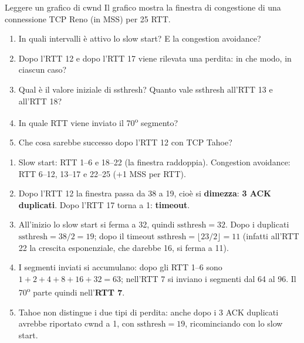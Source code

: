 \begin{esercizio}{Leggere un grafico di cwnd}
Il grafico mostra la finestra di congestione di una connessione TCP Reno (in MSS) per 25 RTT.
\begin{center}
\end{center}
\begin{enumerate}[label=(\alph*)]
    \item In quali intervalli è attivo lo slow start? E la congestion avoidance?
    \item Dopo l'RTT 12 e dopo l'RTT 17 viene rilevata una perdita: in che modo, in ciascun caso?
    \item Qual è il valore iniziale di ssthresh? Quanto vale ssthresh all'RTT 13 e all'RTT 18?
    \item In quale RTT viene inviato il 70\textsuperscript{o} segmento?
    \item Che cosa sarebbe successo dopo l'RTT 12 con TCP Tahoe?
\end{enumerate}
\end{esercizio}

\svolgimento
\begin{enumerate}[label=(\alph*)]
    \item Slow start: RTT 1--6 e 18--22 (la finestra raddoppia). Congestion avoidance: RTT 6--12, 13--17 e 22--25 (+1 MSS per RTT).
    \item Dopo l'RTT 12 la finestra passa da 38 a 19, cioè si \textbf{dimezza}: \textbf{3 ACK duplicati}. Dopo l'RTT 17 torna a 1:
          \textbf{timeout}.
    \item All'inizio lo slow start si ferma a 32, quindi $\text{ssthresh} = 32$. Dopo i duplicati $\text{ssthresh} = 38/2 = 19$;
          dopo il timeout $\text{ssthresh} = \lfloor 23/2 \rfloor = 11$ (infatti all'RTT 22 la crescita esponenziale, che darebbe 16,
          si ferma a 11).
    \item I segmenti inviati si accumulano: dopo gli RTT 1--6 sono $1+2+4+8+16+32 = 63$; nell'RTT 7 si inviano i segmenti dal 64 al
          96. Il 70\textsuperscript{o} parte quindi nell'\textbf{RTT 7}.
    \item Tahoe non distingue i due tipi di perdita: anche dopo i 3 ACK duplicati avrebbe riportato cwnd a 1, con
          $\text{ssthresh} = 19$, ricominciando con lo slow start.
\end{enumerate}

